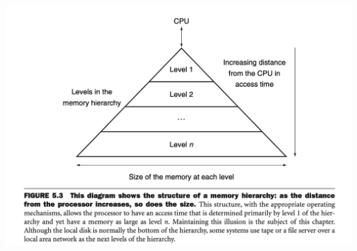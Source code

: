 \documentclass[10pt,a4paper]{article}
\begin{document}
\begin{center}
    \includegraphics[scale=0.35]{images/memory_levels.png}
\end{center}



\end{document}
